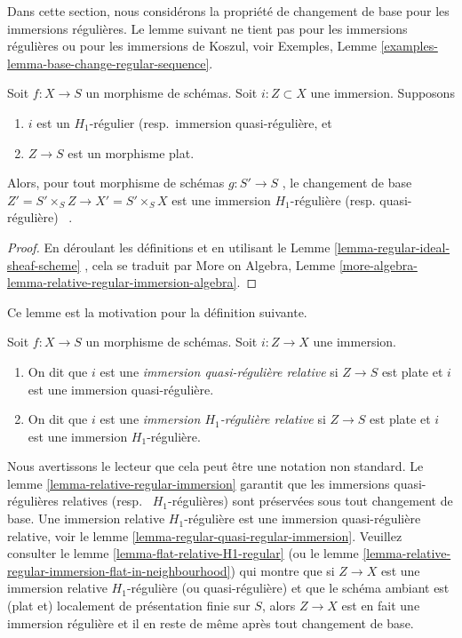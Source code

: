 \noindent
Dans cette section, nous considérons la propriété de changement de base pour les
immersions régulières. Le lemme suivant ne tient pas pour les immersions
régulières ou pour les immersions de Koszul, voir Exemples, Lemme  \ref{examples-lemma-base-change-regular-sequence}.

\begin{lemma}
\label{lemma-relative-regular-immersion}
Soit  $f : X \to S$  un morphisme de schémas. Soit  $i : Z \subset X$  une immersion.
Supposons
\begin{enumerate}
\item $i$  est un  $H_1$-régulier (resp.\ immersion
quasi-régulière, et
\item $Z \to S$  est un morphisme plat.
\end{enumerate}
Alors, pour tout morphisme de schémas  $g : S' \to S$ , le changement de base
 $Z' = S' \times_S Z \to X' = S' \times_S X$  est une immersion  $H_1$-régulière (resp. quasi-régulière)
\ .
\end{lemma}

\begin{proof}
En déroulant les définitions et en utilisant le Lemme  \ref{lemma-regular-ideal-sheaf-scheme} , cela se
traduit par More on Algebra, Lemme  \ref{more-algebra-lemma-relative-regular-immersion-algebra}.
\end{proof}

\noindent
Ce lemme est la motivation pour la définition suivante.

\begin{definition}
\label{definition-relative-H1-regular-immersion}
Soit  $f : X \to S$  un morphisme de schémas. Soit  $i : Z \to X$  une immersion.
\begin{enumerate}
\item On dit que  $i$  est une  {\it  immersion quasi-régulière
relative }  si  $Z \to S$  est plate et  $i$  est une immersion
quasi-régulière.
\item On dit que  $i$  est une  {\it  immersion
 $H_1$-régulière relative }  si  $Z \to S$  est plate et
 $i$  est une immersion  $H_1$-régulière.
\end{enumerate}
\end{definition}

\noindent
Nous avertissons le lecteur que cela peut être une notation non standard. Le lemme
 \ref{lemma-relative-regular-immersion}  garantit que les immersions quasi-régulières relatives (resp.
\ $H_1$-régulières) sont préservées sous tout changement de base.
Une immersion relative  $H_1$-régulière est une immersion quasi-régulière
relative, voir le lemme  \ref{lemma-regular-quasi-regular-immersion}. Veuillez consulter le lemme  \ref{lemma-flat-relative-H1-regular}  (ou
le lemme  \ref{lemma-relative-regular-immersion-flat-in-neighbourhood}) qui montre que si  $Z \to X$  est une immersion relative
 $H_1$-régulière (ou quasi-régulière) et que le schéma ambiant est (plat et)
localement de présentation finie sur  $S$, alors  $Z \to X$  est en fait
une immersion régulière et il en reste de même après tout changement de base.

